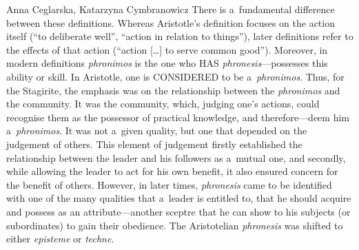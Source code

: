 \begin{artengenv2auth}{Anna Ceglarska, Katarzyna Cymbranowicz}
There is a~fundamental difference between these definitions. Whereas Aristotle's definition focuses on the action itself (``to deliberate well'', ``action in relation to things''), later definitions refer to the effects of that action (``action […] to serve common good''). Moreover, in modern definitions \textit{phronimos} is the one who HAS \textit{phronesis}---possesses this ability or skill. In Aristotle, one is CONSIDERED to be a~\textit{phronimos}. Thus, for the Stagirite, the emphasis was on the relationship between the \textit{phronimos} and the community. It was the community, which, judging one's actions, could recognise them as the possessor of practical knowledge, and therefore---deem him a~\textit{phronimos}. It was not a~given quality, but one that depended on the judgement of others. This element of judgement firstly established the relationship between the leader and his followers as a~mutual one, and secondly, while allowing the leader to act for his own benefit, it also ensured concern for the benefit of others. However, in later times, \textit{phronesis} came to be identified with one of the many qualities that a~leader is entitled to, that he should acquire and possess as an attribute---another sceptre that he can show to his subjects (or subordinates) to gain their obedience. The Aristotelian \textit{phronesis} was shifted to either \textit{episteme} or \textit{techne}.




\end{artengenv2auth}
